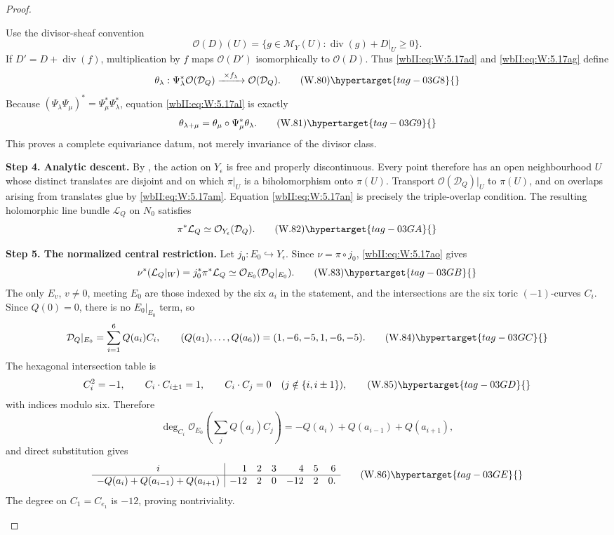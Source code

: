 \begin{proof}
\begin{enumerate}[label={$\langle1\rangle$\arabic*.},leftmargin=*]
Use the divisor-sheaf convention
\[
 \mathcal O(D)(U)=
 \{g\in\mathcal M_Y(U):
   \operatorname{div}(g)+D|_U\geq0\}.
\]
If \(D'=D+\operatorname{div}(f)\), multiplication by \(f\) maps
\(\mathcal O(D')\) isomorphically to \(\mathcal O(D)\).  Thus
\eqref{wbII:eq:W:5.17ad} and \eqref{wbII:eq:W:5.17ag} define
\[
 \theta_\lambda:
 \Psi_\lambda^*\mathcal O(\mathcal D_Q)
 \xrightarrow{\ \times f_\lambda\ }
 \mathcal O(\mathcal D_Q).
\tag{W.80}\hypertarget{tag-03G8}{}\label{wbII:eq:W:5.17am}
\]
Because
\((\Psi_\lambda\Psi_\mu)^*=\Psi_\mu^*\Psi_\lambda^*\),
equation \eqref{wbII:eq:W:5.17al} is exactly
\[
 \theta_{\lambda+\mu}
 =\theta_\mu\circ\Psi_\mu^*\theta_\lambda.
\tag{W.81}\hypertarget{tag-03G9}{}\label{wbII:eq:W:5.17an}
\]
This proves a complete equivariance datum, not merely invariance of the
divisor class.

\noindent\textbf{Step 4. Analytic descent.}
By , the action on \(Y_\epsilon\) is
free and properly discontinuous.  Every point therefore has an open
neighbourhood \(U\) whose distinct translates are disjoint and on which
\(\pi|_U\) is a biholomorphism onto \(\pi(U)\).  Transport
\(\mathcal O(\mathcal D_Q)|_U\) to \(\pi(U)\), and on overlaps arising
from translates glue by \eqref{wbII:eq:W:5.17am}.  Equation \eqref{wbII:eq:W:5.17an} is precisely the
triple-overlap condition.  The resulting holomorphic line bundle
\(\mathcal L_Q\) on \(N_0\) satisfies
\[
 \pi^*\mathcal L_Q
 \simeq\mathcal O_{Y_\epsilon}(\mathcal D_Q).
\tag{W.82}\hypertarget{tag-03GA}{}\label{wbII:eq:W:5.17ao}
\]

\noindent\textbf{Step 5. The normalized central restriction.}
Let \(j_0:E_0\hookrightarrow Y_\epsilon\).  Since
\(\nu=\pi\circ j_0\), \eqref{wbII:eq:W:5.17ao} gives
\[
 \nu^*(\mathcal L_Q|_W)
 =j_0^*\pi^*\mathcal L_Q
 \simeq\mathcal O_{E_0}(\mathcal D_Q|_{E_0}).
\tag{W.83}\hypertarget{tag-03GB}{}\label{wbII:eq:W:5.17ap}
\]
The only \(E_v\), \(v\ne0\), meeting \(E_0\) are those indexed by the
six \(a_i\) in the statement, and the intersections are the six toric
\((-1)\)-curves \(C_i\).  Since \(Q(0)=0\), there is no
\(E_0|_{E_0}\) term, so
\[
 \mathcal D_Q|_{E_0}
 =\sum_{i=1}^6Q(a_i)C_i,
 \qquad
 (Q(a_1),\ldots,Q(a_6))=(1,-6,-5,1,-6,-5).
\tag{W.84}\hypertarget{tag-03GC}{}\label{wbII:eq:W:5.17aq}
\]
The hexagonal intersection table is
\[
 C_i^2=-1,
 \qquad
 C_i\cdot C_{i\pm1}=1,
 \qquad
 C_i\cdot C_j=0
 \quad(j\notin\{i,i\pm1\}),
\tag{W.85}\hypertarget{tag-03GD}{}\label{wbII:eq:W:5.17ar}
\]
with indices modulo six.  Therefore
\[
 \deg_{C_i}\mathcal O_{E_0}
 \!\left(\sum_jQ(a_j)C_j\right)
 =-Q(a_i)+Q(a_{i-1})+Q(a_{i+1}),
\]
and direct substitution gives
\[
 \begin{array}{c|rrrrrr}
 i&1&2&3&4&5&6\\ \hline
 -Q(a_i)+Q(a_{i-1})+Q(a_{i+1})
 &-12&2&0&-12&2&0.
 \end{array}
\tag{W.86}\hypertarget{tag-03GE}{}\label{wbII:eq:W:5.17as}
\]
The degree on \(C_1=C_{e_1}\) is \(-12\), proving nontriviality.


\end{enumerate}
\end{proof}
